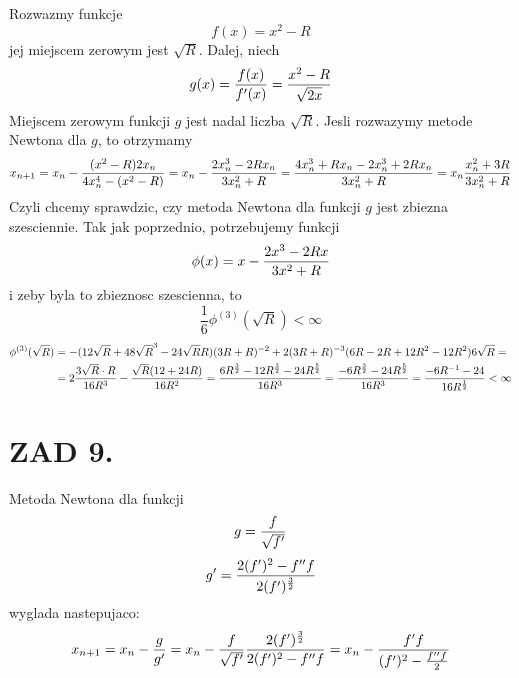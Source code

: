 \documentclass{article}[13pt]
\begin{document}
    Rozwazmy funkcje
    $$f(x)=x^2-R$$
    jej miejscem zerowym jest $\sqrt R$. Dalej, niech
    $$g(x)={f(x)\over f'(x)}={x^2-R\over\sqrt{2x}}$$
    Miejscem zerowym funkcji $g$ jest nadal liczba $\sqrt R$. Jesli rozwazymy metode Newtona dla $g$, to otrzymamy
    \begin{align*}
        x_{n+1}=x_n-{(x^2-R)2x_n\over4x^4_n-(x^2-R)}=x_n-{2x_n^3-2Rx_n\over3x_n^2+R}={4x_n^3+Rx_n-2x_n^3+2Rx_n\over3x_n^2+R}=x_n{x_n^2+3R\over3x_n^2+R}
    \end{align*}
    Czyli chcemy sprawdzic, czy metoda Newtona dla funkcji $g$ jest zbiezna szesciennie. Tak jak poprzednio, potrzebujemy funkcji 
    $$\phi(x)=x-{2x^3-2Rx\over 3x^2+R}$$
    i zeby byla to zbieznosc szescienna, to
    $$\frac16\phi^{(3)}(\sqrt{R})<\infty$$
    \begin{align*}
        \phi^{(3)}(\sqrt{R})&=-(12\sqrt{R}+48\sqrt{R}^3-24\sqrt{R}R)(3R+R)^{-2}+2(3R+R)^{-3}(6R-2R+12R^2-12R^2)6\sqrt{R}=\\
        &=2{3\sqrt{R}\cdot R\over 16R^3}-{\sqrt{R}(12+24R)\over16R^2}={6R^{\frac32}-12R^{\frac32}-24R^{\frac52}\over16R^3}={-6R^{\frac32}-24R^{\frac52}\over16R^3}={-6R^{-1}-24\over16R^{\frac12}}<\infty
    \end{align*}

    \section*{ZAD 9.}

    Metoda Newtona dla funkcji
    $$g={f\over \sqrt{f'}}$$
    $$g'={2(f')^2-f''f\over 2(f')^{\frac32}}$$
    wyglada nastepujaco:
    $$x_{n+1}=x_n-{g\over g'}=x_n-{f\over \sqrt{f'}}{2(f')^{\frac32}\over2(f')^2-f''f}=x_n-{f'f\over(f')^2-{f''f\over2}}$$
\end{document}
